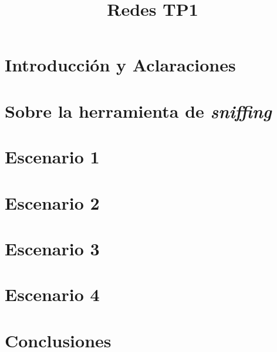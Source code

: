 \documentclass[%
	final,
	notitlepage,
	narroweqnarray,
	inline,
	twoside,
	]{ieee}
\title{Redes TP1}
\newcommand{\latexiie}{\LaTeX2{\Large$_\varepsilon$}}
\begin{document}




\begin{abstract}
	
\end{abstract}


\section*{Introducci\'on y Aclaraciones}\label{sec:introduccion}
	

\section*{Sobre la herramienta de \textit{sniffing}}
	

\section{Escenario 1}
	

\section{Escenario 2}
	

\section{Escenario 3}
	

\section{Escenario 4}
	

\section{Conclusiones}
	
\end{document}
